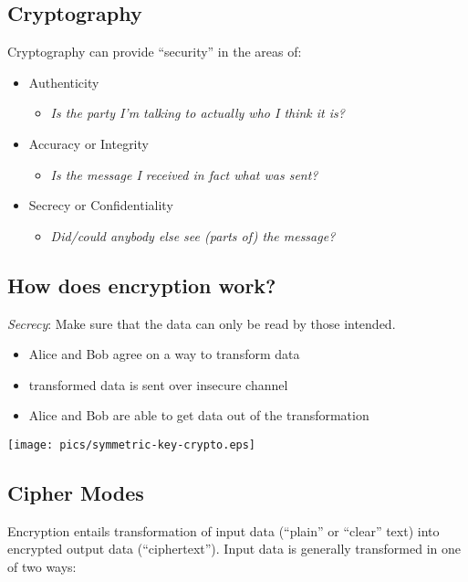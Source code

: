 \documentclass[xga]{xdvislides}
\begin{document}
\subsection{Cryptography}
Cryptography can provide ``security'' in the areas of:
\begin{itemize}
	\item Authenticity
		\begin{itemize}
			\item {\em Is the party I'm talking to actually who I {\em think} it is?}
		\end{itemize}
	\item Accuracy or Integrity
		\begin{itemize}
			\item {\em Is the message I received in fact what was sent?}
		\end{itemize}
	\item Secrecy or Confidentiality
		\begin{itemize}
			\item {\em Did/could anybody else see (parts of) the message?}
		\end{itemize}
\end{itemize}

\subsection{How does encryption work?}
{\em Secrecy}:  Make sure that the data can only be read by those intended.
\begin{itemize}
	\item Alice and Bob agree on a way to transform data
	\item transformed data is sent over insecure channel
	\item Alice and Bob are able to get data out of the transformation
\end{itemize}
\addvspace{.5in}
\begin{center}
	\texttt{[image: pics/symmetric-key-crypto.eps]}
\end{center}

\subsection{Cipher Modes}
Encryption entails transformation of input data (``plain''
or ``clear'' text) into encrypted output data
(``ciphertext'').  Input data is generally transformed
in one of two ways:
\\
\end{document}
